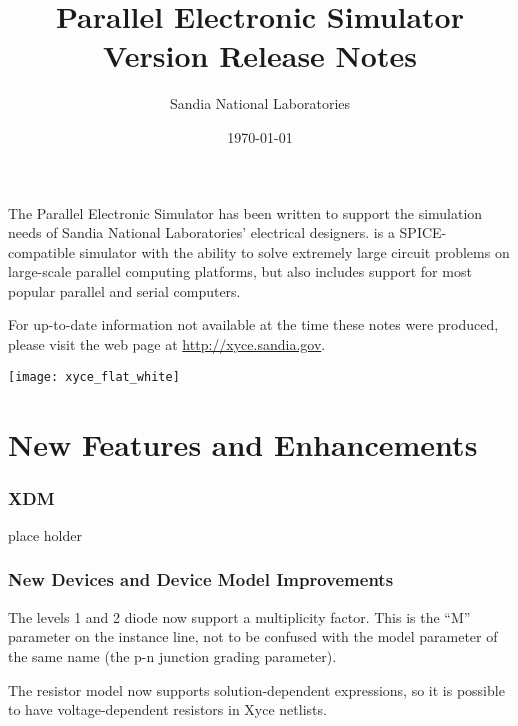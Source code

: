 \documentclass[letterpaper]{scrartcl}
\title{\XyceTitle{} Parallel Electronic Simulator\\
Version \XyceVersionVar{} Release Notes}
\author{ Sandia National Laboratories}
\date{\today}
\begin{document}
\maketitle

The \XyceTM{} Parallel Electronic Simulator has been written to support the
simulation needs of Sandia National Laboratories' electrical designers.
\XyceTM{} is a SPICE-compatible simulator with the ability to solve extremely
large circuit problems on large-scale parallel computing platforms, but also
includes support for most popular parallel and serial computers.

For up-to-date information not available at the time these notes were produced,
please visit the \XyceTM{} web page at
{\color{XyceDeepRed}\url{http://xyce.sandia.gov}}.

\tableofcontents
\vspace*{\fill}
\parbox{\textwidth}
{
  \hfill
  \texttt{[image: xyce\_flat\_white]}
}


\newpage
\section{New Features and Enhancements}

\subsubsection*{XDM}
\begin{XyceItemize}
  \item place holder
\end{XyceItemize}

\subsubsection*{New Devices and Device Model Improvements}
\begin{XyceItemize}
  \item The levels 1 and 2 diode now support a multiplicity factor.  This is the ``M'' parameter on the instance line, not to be confused with the model parameter of the same name (the p-n junction grading parameter).
  \item The resistor model now supports solution-dependent expressions, so it is possible to have voltage-dependent resistors in Xyce netlists.
\end{XyceItemize}
\end{document}
